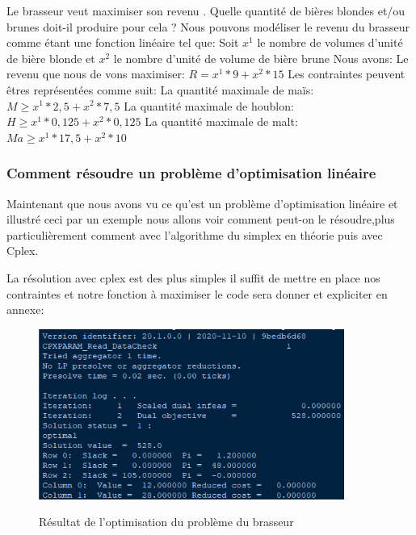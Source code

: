Le brasseur veut maximiser son revenu .\newline
Quelle quantité de bières blondes et/ou brunes doit-il produire pour cela ?\newline
\newline
Nous pouvons modéliser le revenu du brasseur comme étant une fonction linéaire tel que:\newline
Soit $x^{1}$ le nombre de volumes d'unité de bière blonde et $x^{2}$ le nombre d'unité de volume de bière brune\newline
Nous avons:\newline\newline
Le revenu que nous de vons maximiser: $R = x^{1}*9 + x^{2}*15$\newline\newline
Les contraintes peuvent êtres représentées comme suit:\newline\newline
La quantité maximale de maïs: $M \geq x^{1}*2,5+x^{2}*7,5$\newline
La quantité maximale de houblon: $H \geq x^{1}*0,125+x^{2}*0,125$\newline
La quantité maximale de malt: $Ma \geq x^{1}*17,5+x^{2}*10$\newline\newline

\subsubsection{Comment résoudre un problème d'optimisation linéaire}

 Maintenant que nous avons vu ce qu'est un problème d'optimisation linéaire et illustré ceci par un exemple nous allons voir comment peut-on le résoudre,plus particulièrement comment avec l'algorithme du simplex en théorie puis avec Cplex.

 La résolution avec cplex est des plus simples il suffit de mettre en place nos contraintes et notre fonction à maximiser le code sera donner et expliciter en annexe:

 \begin{figure}[h]
   \begin{center}
 \includegraphics[width=10cm]{./images/Brasseur_Resolution.png}\label{Resultat_Brasseur}
 \caption{Résultat de l'optimisation du problème du brasseur}
 \end{center}
 \end{figure}

